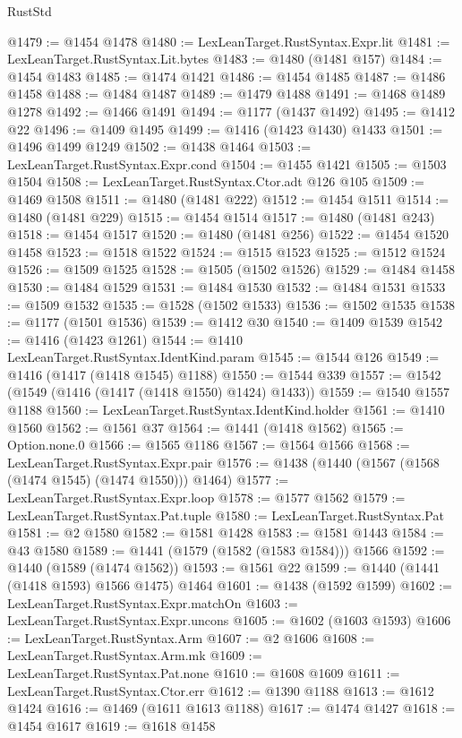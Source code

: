 \begin{lexlean}{RustStd}
\begin{coremodule}
@1479 := @1454 @1478
@1480 := LexLeanTarget.RustSyntax.Expr.lit
@1481 := LexLeanTarget.RustSyntax.Lit.bytes
@1483 := @1480 (@1481 @157)
@1484 := @1454 @1483
@1485 := @1474 @1421
@1486 := @1454 @1485
@1487 := @1486 @1458
@1488 := @1484 @1487
@1489 := @1479 @1488
@1491 := @1468 @1489 @1278
@1492 := @1466 @1491
@1494 := @1177 (@1437 @1492)
@1495 := @1412 @22
@1496 := @1409 @1495
@1499 := @1416 (@1423 @1430) @1433
@1501 := @1496 @1499 @1249
@1502 := @1438 @1464
@1503 := LexLeanTarget.RustSyntax.Expr.cond
@1504 := @1455 @1421
@1505 := @1503 @1504
@1508 := LexLeanTarget.RustSyntax.Ctor.adt @126 @105
@1509 := @1469 @1508
@1511 := @1480 (@1481 @222)
@1512 := @1454 @1511
@1514 := @1480 (@1481 @229)
@1515 := @1454 @1514
@1517 := @1480 (@1481 @243)
@1518 := @1454 @1517
@1520 := @1480 (@1481 @256)
@1522 := @1454 @1520 @1458
@1523 := @1518 @1522
@1524 := @1515 @1523
@1525 := @1512 @1524
@1526 := @1509 @1525
@1528 := @1505 (@1502 @1526)
@1529 := @1484 @1458
@1530 := @1484 @1529
@1531 := @1484 @1530
@1532 := @1484 @1531
@1533 := @1509 @1532
@1535 := @1528 (@1502 @1533)
@1536 := @1502 @1535
@1538 := @1177 (@1501 @1536)
@1539 := @1412 @30
@1540 := @1409 @1539
@1542 := @1416 (@1423 @1261)
@1544 := @1410 LexLeanTarget.RustSyntax.IdentKind.param
@1545 := @1544 @126
@1549 := @1416 (@1417 (@1418 @1545) @1188)
@1550 := @1544 @339
@1557 := @1542 (@1549 (@1416 (@1417 (@1418 @1550) @1424) @1433))
@1559 := @1540 @1557 @1188
@1560 := LexLeanTarget.RustSyntax.IdentKind.holder
@1561 := @1410 @1560
@1562 := @1561 @37
@1564 := @1441 (@1418 @1562)
@1565 := Option.none.{0}
@1566 := @1565 @1186
@1567 := @1564 @1566
@1568 := LexLeanTarget.RustSyntax.Expr.pair
@1576 := @1438 (@1440 (@1567 (@1568 (@1474 @1545) (@1474 @1550))) @1464)
@1577 := LexLeanTarget.RustSyntax.Expr.loop
@1578 := @1577 @1562
@1579 := LexLeanTarget.RustSyntax.Pat.tuple
@1580 := LexLeanTarget.RustSyntax.Pat
@1581 := @2 @1580
@1582 := @1581 @1428
@1583 := @1581 @1443
@1584 := @43 @1580
@1589 := @1441 (@1579 (@1582 (@1583 @1584))) @1566
@1592 := @1440 (@1589 (@1474 @1562))
@1593 := @1561 @22
@1599 := @1440 (@1441 (@1418 @1593) @1566 @1475) @1464
@1601 := @1438 (@1592 @1599)
@1602 := LexLeanTarget.RustSyntax.Expr.matchOn
@1603 := LexLeanTarget.RustSyntax.Expr.uncons
@1605 := @1602 (@1603 @1593)
@1606 := LexLeanTarget.RustSyntax.Arm
@1607 := @2 @1606
@1608 := LexLeanTarget.RustSyntax.Arm.mk
@1609 := LexLeanTarget.RustSyntax.Pat.none
@1610 := @1608 @1609
@1611 := LexLeanTarget.RustSyntax.Ctor.err
@1612 := @1390 @1188
@1613 := @1612 @1424
@1616 := @1469 (@1611 @1613 @1188)
@1617 := @1474 @1427
@1618 := @1454 @1617
@1619 := @1618 @1458

\end{coremodule}
\end{lexlean}
